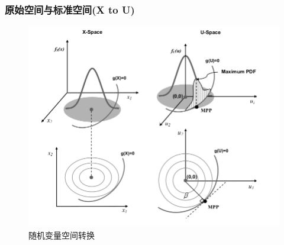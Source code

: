 \documentclass[xcolor=dvipsnames,8pt,handout]{beamer}
\begin{document}
\begin{frame}
  \frametitle{原始空间与标准空间(X to U)}
  \begin{figure}[H]
    \centering
    \includegraphics[height=0.7\textheight]{trans.png} 
    \caption{随机变量空间转换\cite{Choi2007}}
  \end{figure}
\end{frame}
\end{document}
